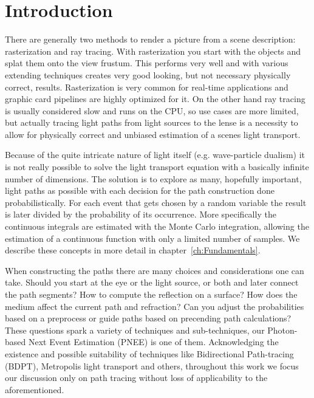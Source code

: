 \chapter{Introduction}
\label{ch:Introduction}

There are generally two methods to render a picture from a scene description: rasterization and ray tracing. With rasterization you start with the objects and splat them onto the view frustum. This performs very well and with various extending techniques creates very good looking, but not necessary physically correct, results.  Rasterization is very common for real-time applications and graphic card pipelines are highly optimized for it. On the other hand ray tracing is usually considered slow and runs on the CPU, so use cases are more limited, but actually tracing light paths from light sources to the lense is a necessity to allow for physically correct and unbiased estimation of a scenes light transport. 

Because of the quite intricate nature of light itself (e.g. wave-particle dualism) it is not really possible to solve the light transport equation with a basically infinite number of dimensions. The solution is to explore as many, hopefully important, light paths as possible with each decision for the path construction done probabilistically. For each event that gets chosen by a random variable the result is later divided by the probability of its occurrence. More specifically the continuous integrals are estimated with the Monte Carlo integration, allowing the estimation of a continuous function with only a limited number of samples. We describe these concepts in more detail in chapter~\ref{ch:Fundamentals}.

When constructing the paths there are many choices and considerations one can take. Should you start at the eye or the light source, or both and later connect the path segments? How to compute the reflection on a surface? How does the medium affect the current path and refraction? Can you adjust the probabilities based on a preprocess or guide paths based on precending path calculations?
These questions spark a variety of techniques and sub-techniques, our Photon-based Next Event Estimation (PNEE) is one of them. Acknowledging the existence and possible suitability of techniques like Bidirectional Path-tracing (BDPT), Metropolis light transport and others, throughout this work we focus our discussion only on path tracing without loss of applicability to the aforementioned.

